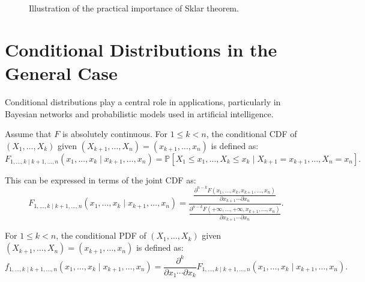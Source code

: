 \begin{figure}[!h]
\caption{Illustration of the practical importance of Sklar theorem.}
\label{fig:RelSklarTh}
\end{figure}

\section{Conditional Distributions in the General Case}\label{sec:conditional_general}
Conditional distributions play a central role in applications, particularly in
Bayesian networks and probabilistic models used in artificial intelligence.

\begin{definition}
Assume that $F$ is absolutely continuous. For $1 \le k < n$, the conditional CDF of
$(X_1,\ldots,X_k)$ given $(X_{k+1},\ldots,X_n) = (x_{k+1},\ldots,x_n)$ is defined as:
\begin{equation}\label{eq:conditional_cdf_def}
F_{1,\ldots,k \mid k+1,\ldots,n}(x_1,\ldots,x_k \mid x_{k+1},\ldots,x_n)
= \mathbb{P}\left[X_1\le x_1, \ldots, X_k \le x_k \mid X_{k+1}=x_{k+1},\ldots, X_n = x_n\right].
\end{equation}
\end{definition}
This can be expressed in terms of the joint CDF as:
\begin{equation}\label{eq:conditional_cdf_via_joint}
F_{1,\ldots,k \mid k+1,\ldots,n}(x_1,\ldots,x_k \mid x_{k+1},\ldots,x_n)
=
\frac{\displaystyle
\frac{\partial^{n-k} F(x_1,\ldots,x_k, x_{k+1},\ldots,x_n)}{\partial x_{k+1} \cdots \partial x_n}
}{
\displaystyle
\frac{\partial^{n-k} F(+\infty,\ldots,+\infty, x_{k+1},\ldots,x_n)}{\partial x_{k+1} \cdots \partial x_n}
}.
\end{equation}
\begin{definition}
For $1 \le k < n$, the conditional PDF of $(X_1,\ldots,X_k)$ given
$(X_{k+1},\ldots,X_n) = (x_{k+1},\ldots,x_n)$ is defined as:
\begin{equation}\label{eq:conditional_pdf_def}
f_{1,\ldots,k \mid k+1,\ldots,n}(x_1,\ldots,x_k \mid x_{k+1},\ldots,x_n)
=
\frac{\partial^k}{\partial x_1 \cdots \partial x_k}
F_{1,\ldots,k \mid k+1,\ldots,n}(x_1,\ldots,x_k \mid x_{k+1},\ldots,x_n).
\end{equation}
\end{definition}

